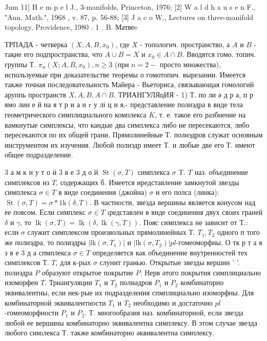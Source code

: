 \documentclass[10pt]{article}
\begin{document}
Jum 11] H e m p e l J., 3-manifolds, Princeton, 1976; [2] W a l d h a u s e n F., "Ann. Math.", 1968 , v. 87, p. 56-88; [3] J a c o W., Lectures on three-manifold topology, Providence, 1980 . 1 . B. Матвеe



ТРПАДА - четверка $\left(X ; A, B, x_{0}\right)$, где $X$ - топологич. пространство, а $A$ и $B$ - тақие его подпространства, что $A \cup B=X$ и $x_{0} \in A \cap B$. Вводятся гомо. топич. группы Т. $\pi_{n}\left(X ; A, B, x_{0}\right), n \geqslant 3$ (при $n=2-$ просто множества), используемые при доказательстве теоремы о гомотопич. вырезании. Имеется также точная последовательность Майера - Вьеториса, связывающая гомологий аруппь пространств $X, A, B, A \cap B$. ТРИАНГУЛЯцИЯ - 1) Т. по ли ә д р а, п р ямо лин е й на я т р и а н $\mathrm{r}$ у лі ц и я,- представление полиэдра в виде тела геометрического симплициального комплекса $K$, т. е. такое его разбиение на вамкнутые симплексы, что кандые два симплекса либо не пересекаются, либо пересекаются по их общей грани. Прямолинейные Т. полиэдров служат основным инструментом их изучения. Любой полиэдр имеет Т. и любые две его Т. имеют общее подразделение.



3 а м к н у т о ӥ 3 в е 3 д о й $\operatorname{St}(\sigma, T)$ симплекса $\sigma$ T. $T$ наз. объединение симплексов из $T$, содержащих б. Имеется иредставление замкнутой звезды симплекса $\sigma \in T$ в виде соединения (джойна) $\sigma$ и его полса (линка): $\operatorname{St}(\sigma, T)=\sigma * 1 \mathrm{k}(\delta, T)$. В частности, звезда вершины является конусом над ее поясом. Если симплекс $\sigma \in T$ ıредставлен в виде соединения двух своих граней $\delta$ и $\gamma$, то $\operatorname{lk}(\sigma, T)=\operatorname{lk}(\delta, \operatorname{lk}(\gamma, T))$. Пояс симплекса не зависит от Т.: если $\sigma$ служит симплексом произвольных прямолинейных Т. $T_{1}, T_{2}$ одного п того же полиэдра, то полиэдры $\left|\mathrm{lk}\left(\sigma, T_{1}\right)\right|$ и $\left|\mathrm{lk}\left(\sigma, T_{2}\right)\right| p l$-гомеоморфны. О тк р т а я з в е 3 д а спмплекса $\sigma \in T$ определяется как объединение внутренностей тех симплексов Т. $T$, для к-рых $\sigma$ слунит гранью. Открытые звезды вершин ' '. полиэдра $P$ образуют открытое покрытие $P$. Нерв әтого покрытия симплициально изоморфен $T$. Триангуляции $T_{1}$ и $T_{2}$ полиәдров $P_{1}$ и $P_{2}$ комбинаторно эквивалентны, если нек-рые их подразделения спмплициально изоморфны. Для комбинаторной эквивалентности $T_{1}$ и $T_{2}$ необходимо и достаточно $p l$-гомеоморфности $P_{1}$ и $P_{2}$. Т. многообразия наз. комбинаторной, если звезда любой ее вершины комбинаторно эквивалентна симплексу. В этом случае звезда любого симıлекса Т. также комбинаторно әквивалентна симплексу.
\end{document}
